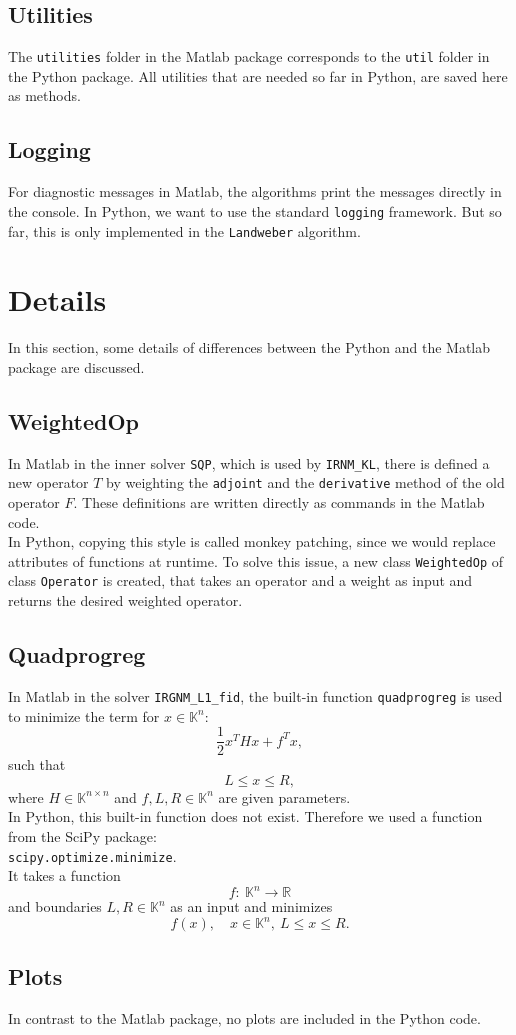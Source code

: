 \documentclass[12pt]{scrartcl}
\begin{document}
\subsection{Utilities}
The \texttt{utilities} folder in the Matlab package corresponds to the \texttt{util} folder in the Python package. All utilities that are needed so far in Python, are saved here as methods.
\subsection{Logging}
For diagnostic messages in Matlab, the algorithms print the messages directly in the console. In Python, we want to use the standard \texttt{logging} framework. But so far, this is only implemented in the \texttt{Landweber} algorithm.
\section{Details}
In this section, some details of differences between the Python and the Matlab package are discussed.
\subsection{WeightedOp}
In Matlab in the inner solver \texttt{SQP}, which is used by \texttt{IRNM\_KL}, there is defined a new operator $T$ by weighting the \texttt{adjoint} and the \texttt{derivative} method of the old operator $F$. These definitions are written directly as commands in the Matlab code.\\
In Python, copying this style is called monkey patching, since we would replace attributes of functions at runtime. To solve this issue, a new class \texttt{WeightedOp} of class \texttt{Operator} is created, that takes an operator and a weight as input and returns the desired weighted operator.
\subsection{Quadprogreg}
In Matlab in the solver \texttt{IRGNM\_L1\_fid}, the built-in function \texttt{quadprogreg} is used to minimize the term for $x\in\mathbb{K}^n$:
$$\frac{1}{2}x^THx+f^Tx,$$
such that
$$L\leq x\leq R,$$
where $H\in\mathbb{K}^{n\times n}$ and $f,L,R\in\mathbb{K}^n$ are given parameters.\\
In Python, this built-in function does not exist. Therefore we used a function from the SciPy package:\\
\texttt{scipy.optimize.minimize}.\\
It takes a function 
$$f:~\mathbb{K}^n\rightarrow\mathbb{R}$$
and boundaries $L,R\in\mathbb{K}^n$ as an input and minimizes
$$f(x),\quad x\in\mathbb{K}^n,~L\leq x\leq R.$$
\subsection{Plots}
In contrast to the Matlab package, no plots are included in the Python code.
\end{document}
